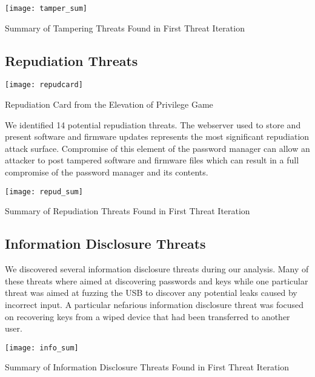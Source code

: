 \begin{table*}[ht]
    \centering
    \texttt{[image: tamper\_sum]}
    \caption{Summary of Tampering Threats Found in First Threat Iteration}
    \label{tab:tampersum}
\end{table*}

\subsection{Repudiation Threats}
\begin{marginfigure}[-0.8 in]%
\centering
  \texttt{[image: repudcard]}
  \caption{Repudiation Card from the Elevation of Privilege Game}
  \label{fig:repudcard}
\end{marginfigure}

We identified 14 potential repudiation threats.  The webserver used to store and present software and firmware updates
represents the most significant repudiation attack surface.  Compromise of this
element of the password manager can allow an attacker to post tampered software
and firmware files which can result in a full compromise of the password manager
and its contents.
\begin{table*}[ht]
    \centering
    \texttt{[image: repud\_sum]}
    \caption{Summary of Repudiation Threats Found in First Threat Iteration}
    \label{tab:repudsum}
\end{table*}



\subsection{Information Disclosure Threats}
We discovered several information disclosure threats during our analysis.  Many
of these threats where aimed at discovering passwords and keys while one
particular threat was aimed at fuzzing the USB to discover any potential leaks
caused by incorrect input.  A particular nefarious information disclosure threat
was focused on recovering keys from a wiped device that had been transferred to
another user. 

\begin{table*}[]
    \centering
    \texttt{[image: info\_sum]}
    \caption{Summary of Information Disclosure Threats Found in First Threat Iteration}
    \label{tab:infosum}
\end{table*}

